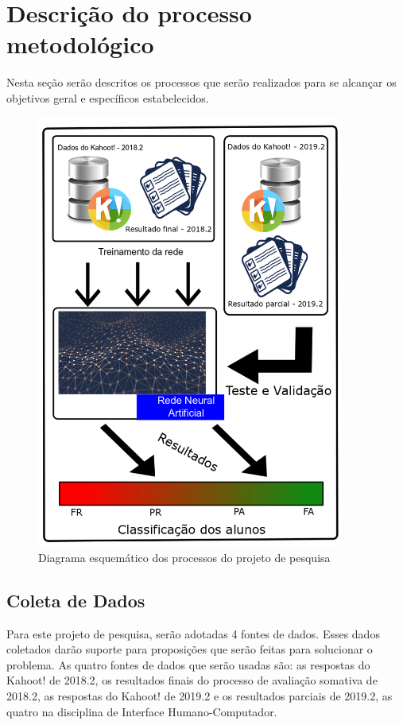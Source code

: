 \documentclass[
	12pt,				%
	openright,			%
	oneside,
	a4paper,			%
	english,			%
	french,				%
	spanish,			%
	brazil,				%
	]{abntex2}
\begin{document}
\section{Descrição do processo metodológico} \label{sec:metodo}

Nesta seção serão descritos os processos que serão realizados para se alcançar os objetivos geral e específicos estabelecidos.

\begin{figure}
    \centering
    \includegraphics[width=0.9\textwidth]{Modelo_Projeto_Pesquisa_UFG_REJ_BCC/ProcessoMetodologico.png}
    \caption{Diagrama esquemático dos processos do projeto de pesquisa}
    \label{fig:my_label}
\end{figure}

\subsection{Coleta de Dados}
Para este projeto de pesquisa, serão adotadas 4 fontes de dados. Esses dados coletados darão suporte para proposições que serão feitas para solucionar o problema. As quatro fontes de dados que serão usadas são: as respostas do Kahoot! de 2018.2, os resultados finais do processo de avaliação somativa de 2018.2, as respostas do Kahoot! de 2019.2 e os resultados parciais de 2019.2, as quatro na disciplina de Interface Humano-Computador.
\end{document}

